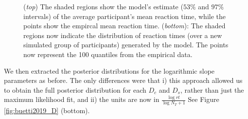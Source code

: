 \documentclass[smallextended, natbib]{svjour3}       %
\begin{document}
\begin{figure}
\centering
{}
\caption{(\textit{top}) The shaded regions show the model's estimate ($53\%$ and $97\%$ intervals) of the average participant's mean reaction time, while the points show the empircal mean reaction time. (\textit{bottom}): The shaded regions now indicate the distribution of reaction times (over a new simulated group of participants) generated by the model. The points now represent the 100 quantiles from the empirical data.}
\label{fig:buetti2019_a1}
\end{figure}

We then extracted the posterior distributions for the logarithmic slope parameters as before. The only differences were that i) this approach allowed us to obtain the full posterior distribution for each $D_c$ and $D_s$, rather than just the maximum likelihood fit, and ii) the units are now in $\frac{\log{rt}}{\log{N_T+1}}$ See Figure \ref{fig:buetti2019_D} (bottom).
\end{document}
